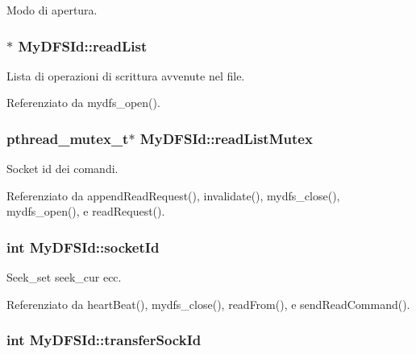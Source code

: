 Modo di apertura. 

\hypertarget{structMyDFSId_a8a4360512d45c22b6d8e980967c7dd32}{
\subsubsection[{read\+List}]{$\ast$ My\+D\+F\+S\+Id\+::read\+List}}\label{structMyDFSId_a8a4360512d45c22b6d8e980967c7dd32}


Lista di operazioni di scrittura avvenute nel file. 



Referenziato da mydfs\+\_\+open().

\hypertarget{structMyDFSId_a71f51c82d7133bfc16fcffeb4c395da0}{
\subsubsection[{read\+List\+Mutex}]{\setlength{\rightskip}{0pt plus 5cm}pthread\+\_\+mutex\+\_\+t$\ast$ My\+D\+F\+S\+Id\+::read\+List\+Mutex}}\label{structMyDFSId_a71f51c82d7133bfc16fcffeb4c395da0}


Socket id dei comandi. 



Referenziato da append\+Read\+Request(), invalidate(), mydfs\+\_\+close(), mydfs\+\_\+open(), e read\+Request().

\hypertarget{structMyDFSId_a382a74f109962751085cea7aac2892cc}{
\subsubsection[{socket\+Id}]{\setlength{\rightskip}{0pt plus 5cm}int My\+D\+F\+S\+Id\+::socket\+Id}}\label{structMyDFSId_a382a74f109962751085cea7aac2892cc}


Seek\+\_\+set seek\+\_\+cur ecc. 



Referenziato da heart\+Beat(), mydfs\+\_\+close(), read\+From(), e send\+Read\+Command().

\hypertarget{structMyDFSId_a3b62a6d0f52a871bda4bf9cd56c57ff7}{
\subsubsection[{transfer\+Sock\+Id}]{\setlength{\rightskip}{0pt plus 5cm}int My\+D\+F\+S\+Id\+::transfer\+Sock\+Id}}\label{structMyDFSId_a3b62a6d0f52a871bda4bf9cd56c57ff7}


